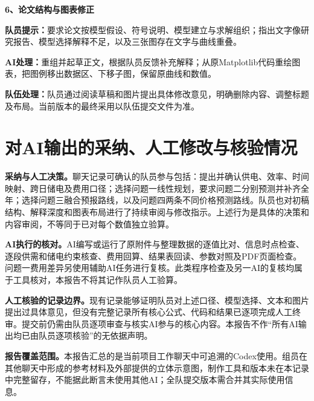 \documentclass[UTF8,a4paper,12pt]{ctexart}
\newcommand{\field}[2]{\par\noindent\textbf{#1：}#2\par}
\newcommand{\example}[2]{\vspace{6pt}\noindent\textbf{#1、#2}\par}
\begin{document}
\example{6}{论文结构与图表修正}
\field{队员提示}{要求论文按模型假设、符号说明、模型建立与求解组织；指出文字像研究报告、模型选择解释不足，以及三张图存在文字与曲线重叠。}
\field{AI处理}{重组并起草正文，根据队员反馈补充解释；从原Matplotlib代码重绘图表，把图例移出数据区、下移子图，保留原曲线和数值。}
\field{队伍处理}{队员通过阅读草稿和图片提出具体修改意见，明确删除内容、调整标题及布局。当前版本的最终采用以队伍提交文件为准。}

\section{对AI输出的采纳、人工修改与核验情况}

\textbf{采纳与人工决策。}聊天记录可确认的队员参与包括：提出并确认供电、效率、时间映射、跨日储电及费用口径；选择问题一线性规划，要求问题二分别预测并补齐全年；选择问题三融合预报路线，以及问题四两条不同价格预测路线。队员也对初稿结构、解释深度和图表布局进行了持续审阅与修改指示。上述行为是具体的决策和内容审阅，不等同于已对每个数值独立验算。

\textbf{AI执行的核对。}AI编写或运行了原附件与整理数据的逐值比对、信息时点检查、逐段供需和储电约束核查、费用回算、结果表回读、参数对照及PDF页面检查。问题一费用差异另使用辅助AI任务进行复核。此类程序检查及另一AI的复核均属于工具核对，本报告不将其记作队员人工验算。

\textbf{人工核验的记录边界。}现有记录能够证明队员对上述口径、模型选择、文本和图片提出过具体意见，但没有完整记录所有核心公式、代码和结果已逐项完成人工终审。提交前仍需由队员逐项审查与核实AI参与的核心内容。本报告不作“所有AI输出均已由队员逐项核验”的无依据声明。

\textbf{报告覆盖范围。}本报告汇总的是当前项目工作聊天中可追溯的Codex使用。组员在其他聊天中形成的参考材料及外部提供的立体示意图，制作工具和版本未在本记录中完整留存，不能据此断言未使用其他AI；全队提交版本需合并其实际使用信息。
\end{document}
